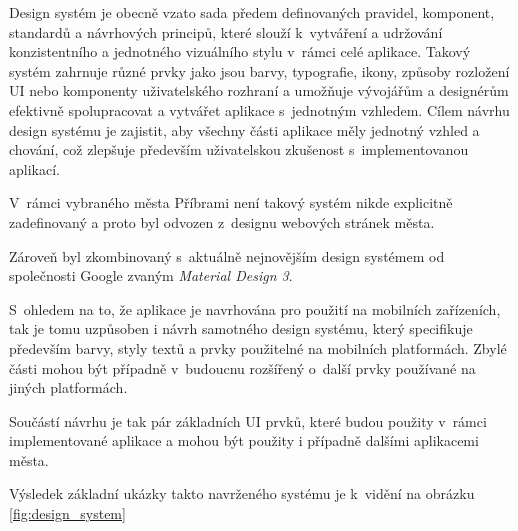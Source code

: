 Design systém je obecně vzato sada předem definovaných pravidel, komponent, standardů a návrhových principů, které slouží k~vytváření a udržování 
konzistentního a jednotného vizuálního stylu v~rámci celé aplikace. Takový systém zahrnuje různé prvky jako jsou barvy, typografie, ikony,
způsoby rozložení UI nebo komponenty uživatelského rozhraní a umožňuje vývojářům a designérům efektivně spolupracovat a vytvářet aplikace s~jednotným 
vzhledem. Cílem návrhu design systému je zajistit, aby všechny části aplikace měly jednotný vzhled a chování, což zlepšuje především uživatelskou 
zkušenost s~implementovanou aplikací. 



V~rámci vybraného města Příbrami není takový systém nikde explicitně zadefinovaný a proto byl odvozen z~designu webových stránek města.

Zároveň byl zkombinovaný s~aktuálně nejnovějším design systémem od společnosti Google zvaným \textit{Material Design 3}.

S~ohledem na to, že aplikace je navrhována pro použití na mobilních zařízeních, tak je tomu uzpůsoben i návrh samotného design systému, který
specifikuje především barvy, styly textů a prvky použitelné na mobilních platformách. Zbylé části mohou být případně v~budoucnu rozšířený o~další prvky 
používané na jiných platformách.

Součástí návrhu je tak pár základních UI prvků, které budou použity v~rámci implementované aplikace a mohou být použity i případně dalšími 
aplikacemi města.

Výsledek základní ukázky takto navrženého systému je k~vidění na obrázku \ref{fig:design_system}

\bigskip

